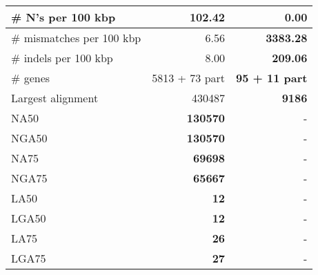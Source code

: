 \documentclass[12pt,a4paper]{article}
\begin{document}
\begin{table}[ht]
\begin{center}
\begin{tabular}{|l*{2}{|r}|}
\# N's per 100 kbp & 102.42 & {\bf 0.00} \\ \hline
\# mismatches per 100 kbp & 6.56 & {\bf 3383.28} \\ \hline
\# indels per 100 kbp & 8.00 & {\bf 209.06} \\ \hline
\# genes & 5813 + 73 part & {\bf 95 + 11 part} \\ \hline
Largest alignment & 430487 & {\bf 9186} \\ \hline
NA50 & {\bf 130570} & - \\ \hline
NGA50 & {\bf 130570} & - \\ \hline
NA75 & {\bf 69698} & - \\ \hline
NGA75 & {\bf 65667} & - \\ \hline
LA50 & {\bf 12} & - \\ \hline
LGA50 & {\bf 12} & - \\ \hline
LA75 & {\bf 26} & - \\ \hline
LGA75 & {\bf 27} & - \\ \hline
\end{tabular}
\end{center}
\end{table}
\end{document}
